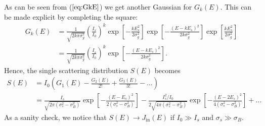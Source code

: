 \documentclass[a4paper,11pt]{article}
\begin{document}
As can be seen from ($\ref{eq:GkE}$) we get another Gaussian for $G_k(E)$. This can be made explicit by completing the square:
\begin{align}
\nonumber G_k(E) &= \frac{1}{\sqrt{2k \pi \sigma_g^2}}\left(\frac{I_s}{I_0}\right)^k \exp\left[-\frac{kE_s^2}{2\sigma_g^2}\right]\exp\left[-\frac{(E-kE_s)^2}{2k\sigma_g^2}\right]\exp\left[\frac{kE_s^2}{2\sigma_g^2}\right]\\
&=\frac{1}{\sqrt{2k \pi \sigma_g^2}}\left(\frac{I_s}{I_0}\right)^k \exp\left[-\frac{(E-kE_s)^2}{2k\sigma_g^2}\right].
\end{align}
Hence, the single scattering distribution $S(E)$ becomes
\begin{align}
\nonumber S(E) &= I_0\left(G_1(E)-\frac{G_2(E)}{2!}+\frac{G_3(E)}{3!}-\dots\right)\\
&= \frac{I_s}{\sqrt{2\pi(\sigma_s^2-\sigma_B^2)}}\exp\left[-\frac{(E-E_s)^2}{2(\sigma_s^2-\sigma_B^2)}\right]-\frac{I_s^2/I_0}{2\sqrt{4\pi(\sigma_s^2-\sigma_B^2)}}\exp\left[-\frac{(E-2E_s)^2}{4(\sigma_s^2-\sigma_B^2)}\right]+\dots
\end{align}
As a sanity check, we notice that $S(E)\rightarrow J_{\mathrm{in}}(E)$ if $I_0\gg I_s$ and $\sigma_s \gg \sigma_B$. 
\end{document}
